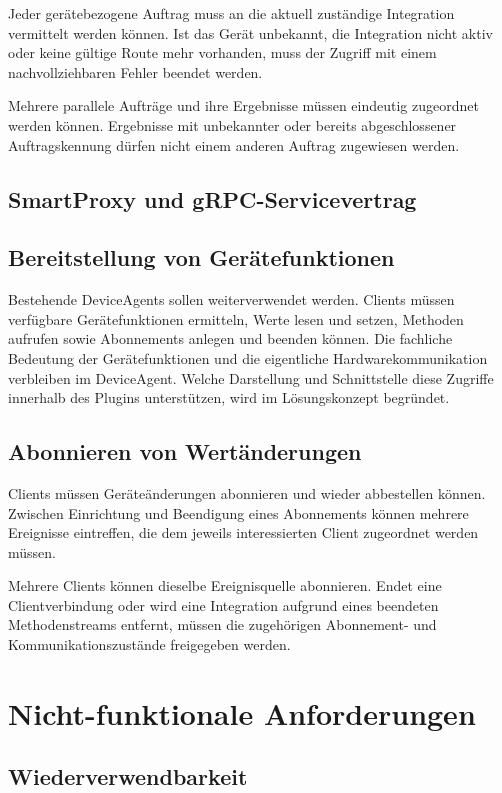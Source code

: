 Jeder gerätebezogene Auftrag muss an die aktuell zuständige Integration vermittelt werden können. Ist das Gerät unbekannt, die Integration nicht aktiv oder keine gültige Route mehr vorhanden, muss der Zugriff mit einem nachvollziehbaren Fehler beendet werden.

Mehrere parallele Aufträge und ihre Ergebnisse müssen eindeutig zugeordnet werden können. Ergebnisse mit unbekannter oder bereits abgeschlossener Auftragskennung dürfen nicht einem anderen Auftrag zugewiesen werden.

\subsection{SmartProxy und gRPC-Servicevertrag}

\subsection{Bereitstellung von Gerätefunktionen}

Bestehende DeviceAgents sollen weiterverwendet werden. Clients müssen verfügbare Gerätefunktionen ermitteln, Werte lesen und setzen, Methoden aufrufen sowie Abonnements anlegen und beenden können. Die fachliche Bedeutung der Gerätefunktionen und die eigentliche Hardwarekommunikation verbleiben im DeviceAgent. Welche Darstellung und Schnittstelle diese Zugriffe innerhalb des Plugins unterstützen, wird im Lösungskonzept begründet.

\subsection{Abonnieren von Wertänderungen}

Clients müssen Geräteänderungen abonnieren und wieder abbestellen können. Zwischen Einrichtung und Beendigung eines Abonnements können mehrere Ereignisse eintreffen, die dem jeweils interessierten Client zugeordnet werden müssen.

Mehrere Clients können dieselbe Ereignisquelle abonnieren. Endet eine Clientverbindung oder wird eine Integration aufgrund eines beendeten Methodenstreams entfernt, müssen die zugehörigen Abonnement- und Kommunikationszustände freigegeben werden.

\section{Nicht-funktionale Anforderungen}

\subsection{Wiederverwendbarkeit}

